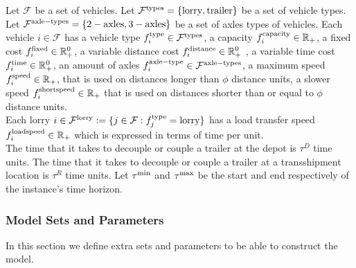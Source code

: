Let
$\mathcal F$
be a set of vehicles.
Let
$\mathcal F^{\rm types} = \{ {\rm \text{lorry}}, {\rm \text{trailer}} \} $
be a set of vehicle types.
Let
$\mathcal F^{\rm axle-types} = \{ {\rm {2-axles}}, {\rm {3-axles}} \} $
be a set of axles types of vehicles.
Each vehicle
$i \in \mathcal F$
has a vehicle type
$f^{\rm type}_i \in \mathcal F^{\rm types}$,
a capacity
$f^{\rm capacity}_i \in \mathbb{R}_+$,
a fixed cost
$f^{\rm fixed}_i \in \mathbb{R}^0_+$,
a variable distance cost
$f^{\rm distance}_i \in \mathbb{R}^0_+$ ,
a variable time cost
$f^{\rm time}_i \in \mathbb{R}^0_+$,
an amount of axles
$f^{\rm axle-type}_i \in \mathcal F^{\rm axle-types}$,
a maximum speed
$f^{\rm speed}_i \in \mathbb{R}_+$,
that is used on distances longer than $\phi$ distance units,
a slower speed
$f^{\rm shortspeed}_i \in \mathbb{R}_+$
that is used on distances shorter than or equal to $\phi$ distance units.
\\

Each lorry
$i \in \mathcal F^{\rm lorry} :=
\{j \in \mathcal F: f^{\rm type}_j = \rm lorry\}$
has a load transfer speed
$f^{\rm loadspeed}_i \in \mathbb{R}_+$
which is expressed in terms of time per unit.
\\




The time that it takes to decouple or couple a trailer at the depot is $\tau^D$ time units.
The time that it takes to decouple or couple a trailer at a transshipment location is $\tau^R$ time units.
Let $ \tau^{\rm min}$ and $\tau^{\rm max}$ be the start and end respectively of the instance's time horizon.\\





\subsubsection{Model Sets and Parameters}

In this section we define extra sets and parameters to be able to construct the model.\\


